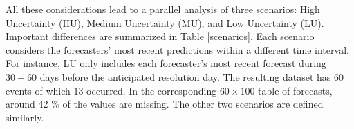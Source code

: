\documentclass[11pt]{article}
\theoremstyle{definition}
\theoremstyle{definition}
\begin{document}
All these considerations lead to a parallel analysis of three scenarios: High Uncertainty (HU), Medium Uncertainty (MU), and Low Uncertainty (LU). Important differences are summarized in Table \ref{scenarios}. Each scenario considers the forecasters' most recent predictions within a different time interval.  For instance, LU only includes each forecaster's most recent forecast during $30-60$ days before the anticipated resolution day. The resulting dataset has $60$ events of which $13$ occurred. In the corresponding $60 \times 100$ table of forecasts, around 42 \% of the values are missing. The other two scenarios are defined similarly. 



% 
 




\end{document}
